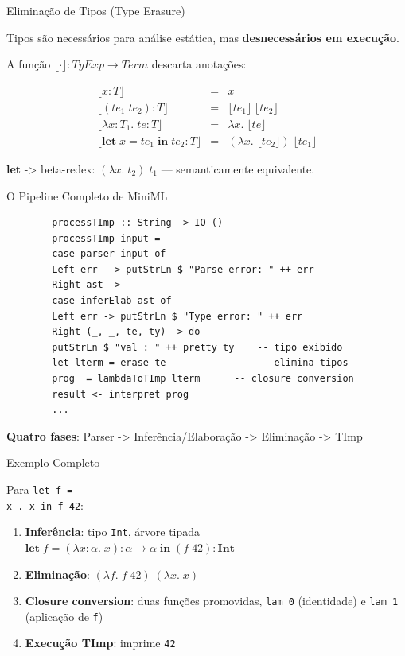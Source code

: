 \begin{frame}{Eliminação de Tipos (Type Erasure)}

    Tipos são necessários para análise estática, mas \textbf{desnecessários
    em execução}.

    A função \(\lfloor \cdot \rfloor : \mathit{TyExp} \to \mathit{Term}\)
    descarta anotações:

    \[\begin{array}{rcl}
    \lfloor x : T \rfloor & = & x \\
    \lfloor (te_1\; te_2) : T \rfloor & = & \lfloor te_1 \rfloor\; \lfloor te_2 \rfloor \\
    \lfloor \lambda x {:} T_1.\; te : T \rfloor & = & \lambda x.\; \lfloor te \rfloor \\
    \lfloor \mathbf{let}\; x = te_1\; \mathbf{in}\; te_2 : T \rfloor & = & (\lambda x.\; \lfloor te_2 \rfloor)\; \lfloor te_1 \rfloor
\end{array}\]

\textbf{let} -> beta-redex: \((\lambda x.\; t_2)\; t_1\) ---
semanticamente equivalente.
\end{frame}

\begin{frame}[fragile]{O Pipeline Completo de MiniML}

    \begin{lstlisting}
        processTImp :: String -> IO ()
        processTImp input =
        case parser input of
        Left err  -> putStrLn $ "Parse error: " ++ err
        Right ast ->
        case inferElab ast of
        Left err -> putStrLn $ "Type error: " ++ err
        Right (_, _, te, ty) -> do
        putStrLn $ "val : " ++ pretty ty    -- tipo exibido
        let lterm = erase te                -- elimina tipos
        prog  = lambdaToTImp lterm      -- closure conversion
        result <- interpret prog
        ...
    \end{lstlisting}

    \textbf{Quatro fases}: Parser -> Inferência/Elaboração -> Eliminação ->
    TImp
\end{frame}

\begin{frame}[fragile]{Exemplo Completo}

    Para \texttt{let f = \\x . x in f 42}:

    \begin{enumerate}
        \item
        \textbf{Inferência}: tipo \texttt{Int}, árvore tipada
        \(\mathbf{let}\; f = (\lambda x{:}\alpha.\; x){:}\alpha \to \alpha\; \mathbf{in}\; (f\; 42){:}\mathbf{Int}\)
        \item
        \textbf{Eliminação}: \((\lambda f.\; f\; 42)\; (\lambda x.\; x)\)
        \item
        \textbf{Closure conversion}: duas funções promovidas,
        \texttt{lam\_0} (identidade) e
        \texttt{lam\_1} (aplicação de
        \texttt{f})
        \item
        \textbf{Execução TImp}: imprime \texttt{42}
    \end{enumerate}
\end{frame}


